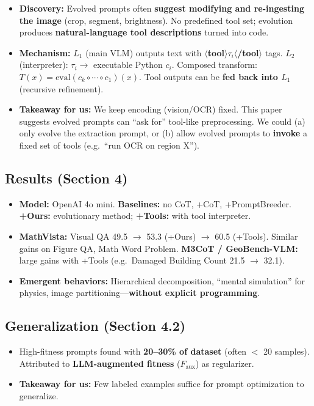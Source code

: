 \documentclass[11pt,a4paper]{article}
\begin{document}
\begin{itemize}
  \item \textbf{Discovery:} Evolved prompts often \textbf{suggest modifying and re-ingesting the image} (crop, segment, brightness). No predefined tool set; evolution produces \textbf{natural-language tool descriptions} turned into code.
  \item \textbf{Mechanism:} $L_1$ (main VLM) outputs text with \textbf{$\langle$tool$\rangle \tau_i \langle$/tool$\rangle$} tags. $L_2$ (interpreter): $\tau_i \to$ executable Python $c_i$. Composed transform: $T(x) = \mathrm{eval}(c_k \circ \cdots \circ c_1)(x)$. Tool outputs can be \textbf{fed back into $L_1$} (recursive refinement).
  \item \textbf{Takeaway for us:} We keep encoding (vision/OCR) fixed. This paper suggests evolved prompts can ``ask for'' tool-like preprocessing. We could (a) only evolve the extraction prompt, or (b) allow evolved prompts to \textbf{invoke} a fixed set of tools (e.g.\ ``run OCR on region X'').
\end{itemize}

\subsection{Results (Section 4)}

\begin{itemize}
  \item \textbf{Model:} OpenAI 4o mini. \textbf{Baselines:} no CoT, +CoT, +PromptBreeder. \textbf{+Ours:} evolutionary method; \textbf{+Tools:} with tool interpreter.
  \item \textbf{MathVista:} Visual QA 49.5 $\to$ 53.3 (+Ours) $\to$ 60.5 (+Tools). Similar gains on Figure QA, Math Word Problem. \textbf{M3CoT / GeoBench-VLM:} large gains with +Tools (e.g.\ Damaged Building Count 21.5 $\to$ 32.1).
  \item \textbf{Emergent behaviors:} Hierarchical decomposition, ``mental simulation'' for physics, image partitioning---\textbf{without explicit programming}.
\end{itemize}

\subsection{Generalization (Section 4.2)}

\begin{itemize}
  \item High-fitness prompts found with \textbf{20--30\% of dataset} (often $<$ 20 samples). Attributed to \textbf{LLM-augmented fitness} ($F_{\mathrm{aux}}$) as regularizer.
  \item \textbf{Takeaway for us:} Few labeled examples suffice for prompt optimization to generalize.
\end{itemize}
\end{document}

